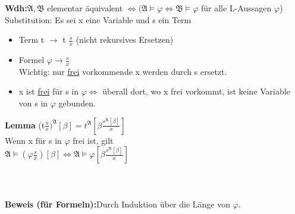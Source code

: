 \documentclass[a4paper]{scrartcl}
\begin{document}
\textbf{Wdh:}$\mathfrak{A},\mathfrak{B}$ elementar äquivalent $\Leftrightarrow (\mathfrak{A} \models \varphi \Leftrightarrow \mathfrak{B}\models \varphi$ für alle L-Aussagen $\varphi$)\\
Substitution: Es sei x eine Variable und s ein Term\begin{itemize}
\item Term t $\rightarrow$ t $\frac{s}{x}$ (nicht rekursives Ersetzen)
\item Formel $\varphi \to \frac{s}{x}$\\
Wichtig: nur \underline{frei} vorkommende  x werden durch s ersetzt.
\item x ist \underline{frei} für s in $\varphi \Leftrightarrow$ überall dort, wo x frei vorkommt, ist keine Variable von s in $\varphi$ gebunden.
\end{itemize}
\textbf{Lemma} (t$\frac{s}{x})^\mathfrak{A}[\beta]=t^\mathfrak{A}[\beta \frac{s^\mathfrak{A}[\beta]}{x}]$\\
Wenn x für s in $\varphi$ frei ist, gilt\\
$\mathfrak{A}\models(\varphi\frac{s}{x})[\beta]\Leftrightarrow \mathfrak{A}\models \varphi[\beta\frac{s^\mathfrak{A}[\beta]}{x}]$\\ \\ \\  \\
\textbf{Beweis (für Formeln):}Durch Induktion über die Länge von $\varphi$.
\end{document}
